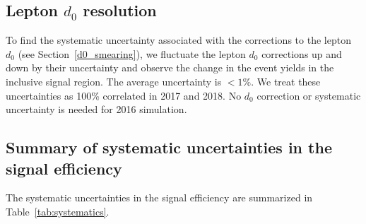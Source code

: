 

\subsection{Lepton $d_0$ resolution}
To find the systematic uncertainty associated with the corrections to the lepton $d_0$ (see Section~\ref{d0_smearing}), we fluctuate the lepton $d_0$ corrections up and down by their uncertainty and observe the change in the event yields in the inclusive signal region. The average uncertainty is $<1\%$. We treat these uncertainties as 100\% correlated in 2017 and 2018. No $d_0$ correction or systematic uncertainty is needed for 2016 simulation.

\subsection{Summary of systematic uncertainties in the signal efficiency}
\label{sec:signalSystematicsSummary}

The systematic uncertainties in the signal efficiency are summarized in Table~\ref{tab:systematics}. 

